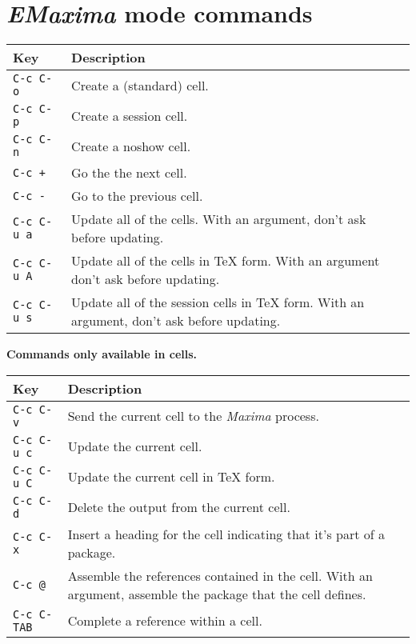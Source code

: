 \documentclass{article}
\newcommand{\emx}{\textsl{\sffamily EMaxima}}
\newcommand{\mx}{\textsl{\sffamily Maxima}}
\begin{document}
\section{\emx{} mode commands}
\label{app:emx}

\noindent
\begin{tabular}{p{\firstcol}p{\secondcol}}
\hline
\textbf{Key} & \textbf{Description}\\
\hline
\texttt{C-c C-o} & Create a (standard) cell.\\
\texttt{C-c C-p} & Create a session cell.\\
\texttt{C-c C-n} & Create a noshow cell.\\
\texttt{C-c +} & Go the the next cell.\\
\texttt{C-c -} & Go to the previous cell.\\
\texttt{C-c C-u a} & 
Update all of the cells.  With an argument, don't ask before updating.\\
\texttt{C-c C-u A}
& Update all of the cells in \TeX{} form. With an argument don't ask
before updating.\\
\texttt{C-c C-u s}
& Update all of the session cells in \TeX{} form.  With an
argument, don't ask before updating.
\end{tabular}

\newpage

\noindent
\textbf{Commands only available in cells.}

\smallskip

\noindent
\begin{tabular}{p{\firstcol}p{\secondcol}}
\hline
\textbf{Key} & \textbf{Description}\\
\hline
\texttt{C-c C-v}
& Send the current cell to the \mx{} process.\\
\texttt{C-c C-u c}
& Update the current cell.\\
\texttt{C-c C-u C}
& Update the current cell in \TeX{} form.\\
\texttt{C-c C-d}
& Delete the output from the current cell.\\
\texttt{C-c C-x}
& Insert a heading for the cell indicating that it's part of a
package. \\
\texttt{C-c @}
& Assemble the references contained in the cell.  With an argument,
assemble the package that the cell defines.\\
\texttt{C-c C-\texttt{TAB}}
& Complete a reference within a cell.
\end{tabular}
\end{document}
